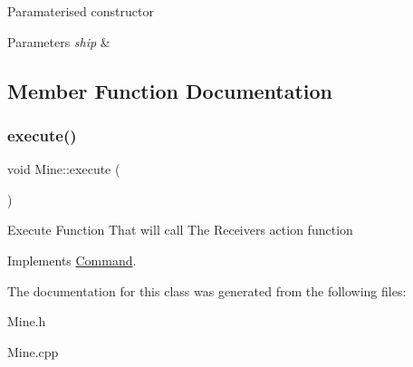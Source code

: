 Paramaterised constructor 
\begin{DoxyParams}{Parameters}
{\em ship} & \\
\hline
\end{DoxyParams}


\subsection{Member Function Documentation}
\mbox{\label{classMine_a2cfa55d098ec47369eed81226d82da25}} 
\subsubsection{\texorpdfstring{execute()}{execute()}}
{\footnotesize\ttfamily void Mine\+::execute (\begin{DoxyParamCaption}{ }\end{DoxyParamCaption})\hspace{0.3cm}{\ttfamily [virtual]}}

Execute Function That will call The Receivers action function 

Implements \hyperlink{classCommand_a6fd7d9bd8df8bfc881e4d6c7cd1878b7}{Command}.



The documentation for this class was generated from the following files\+:\begin{DoxyCompactItemize}
\item 
Mine.\+h\item 
Mine.\+cpp\end{DoxyCompactItemize}
